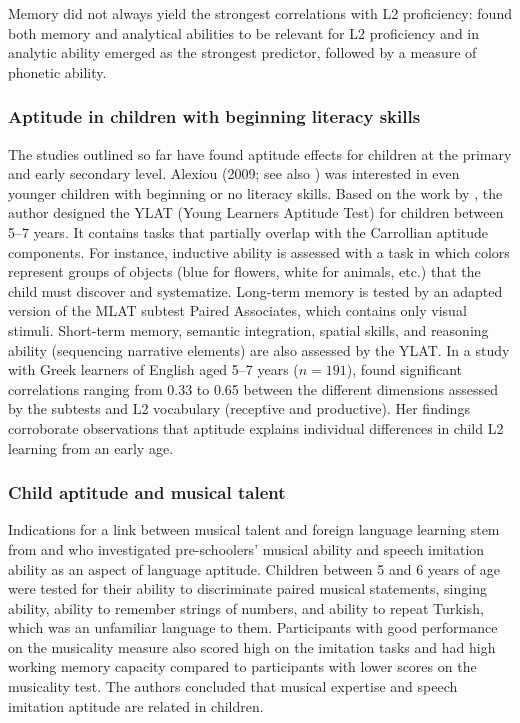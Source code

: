 \documentclass[output=paper]{langscibook}
\begin{document}
Memory did not always yield the strongest correlations with L2 proficiency: \citet[140]{KissNikolov2005} found both memory and analytical abilities to be relevant for L2 proficiency and in \citet{RoehrBrackinTellier2019} analytic ability emerged as the strongest predictor, followed by a measure of phonetic ability.

\subsubsection{Aptitude in children with beginning literacy skills} %

The studies outlined so far have found aptitude effects for children at the primary and early secondary level. Alexiou (2009; see also \citealt{MiltonAlexiou2006}) was interested in even younger children with beginning or no literacy skills. Based on the work by \citet{EsserKossling1986}, the author designed the YLAT (Young Learners Aptitude Test) for children between 5--7 years. It contains tasks that partially overlap with the Carrollian aptitude components. For instance, inductive ability is assessed with a task in which colors represent groups of objects (blue for flowers, white for animals, etc.) that the child must discover and systematize. Long-term memory is tested by an adapted version of the MLAT subtest Paired Associates, which contains only visual stimuli. Short-term memory, semantic integration, spatial skills, and reasoning ability (sequencing narrative elements) are also assessed by the YLAT. In a study with Greek learners of English aged 5--7 years ($n=191$), \citet{Alexiou2009} found significant correlations ranging from 0.33 to 0.65 between the different dimensions assessed by the subtests and L2 vocabulary (receptive and productive). Her findings corroborate observations that aptitude explains individual differences in child L2 learning from an early age. 

\subsubsection{Child aptitude and musical talent} %

Indications for a link between musical talent and foreign language learning stem from \citet[$n=35$]{ChristinerReiterer2018} and \citet[$n=36$]{Christiner2018} who investigated pre-schoolers’ musical ability and speech imitation ability as an aspect of language aptitude. Children between 5 and 6 years of age were tested for their ability to discriminate paired musical statements, singing ability, ability to remember strings of numbers, and ability to repeat Turkish, which was an unfamiliar language to them. Participants with good performance on the musicality measure also scored high on the imitation tasks and had high working memory capacity compared to participants with lower scores on the musicality test. The authors concluded that musical expertise and speech imitation aptitude are related in children. 
\end{document}
